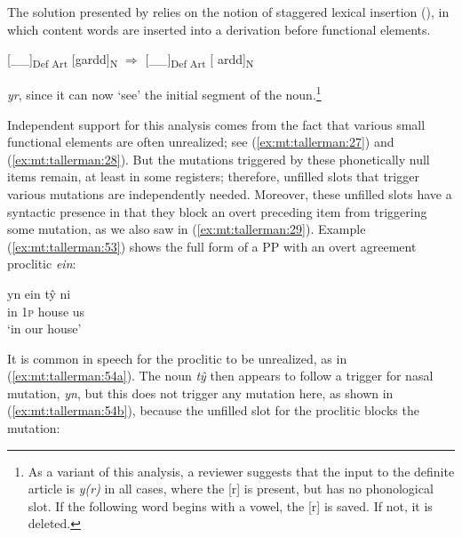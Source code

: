 \documentclass[output=paper,colorlinks,citecolor=brown]{langscibook}
\begin{document}
The solution presented by \citet{HannahsTallerman2006} relies on the notion of staggered lexical insertion (\citealt{Emonds2000,Emonds2002}), in which content words are inserted into a derivation before functional elements.

\ea
{  [\_\_]}{\textsubscript{Def Art}}{ [gardd]}{\textsubscript{N}}{} $\Rightarrow${ [\_\_]}{\textsubscript{Def Art}}{ [ ardd]}{\textsubscript{N}}{}
\z

 {\textit{yr}}{, since it can now} {‘see’ the initial segment of the noun.}\footnote{{As a variant of this analysis, a reviewer suggests that the input to the definite article is} {\textit{y(r)} }{in all cases, where the [r] is present, but has no phonological slot. If the following word begins with a vowel, the [r] is saved. If not, it is deleted.}}

{Independent support for this analysis comes from the fact that various small functional elements are often unrealized; see (\ref{ex:mt:tallerman:27}) and (\ref{ex:mt:tallerman:28}). But the mutations triggered by these phonetically null items remain, at least in some registers; therefore, unfilled slots that trigger various mutations are independently needed. Moreover, these unfilled slots have a syntactic presence in that they block an overt preceding item from triggering some mutation, as we also saw in (\ref{ex:mt:tallerman:29}). Example (\ref{ex:mt:tallerman:53}) shows the full form of a PP with an overt agreement proclitic} {\textit{ein}}{:}

\ea\label{ex:mt:tallerman:53}
\gll  yn ein tŷ ni \\
in \textsc{1p} house us\\ 
\glt ‘in our house’
\z

{It is common in speech for the proclitic to be unrealized, as in (\ref{ex:mt:tallerman:54a}). The noun} {\textit{tŷ}}{ then appears to follow a trigger for nasal mutation,} {\textit{yn}}{, but this does not trigger any mutation here, as shown in (\ref{ex:mt:tallerman:54b}), because the unfilled slot for the proclitic blocks the mutation:}

\ea
{}
\z
\z
\end{document}
